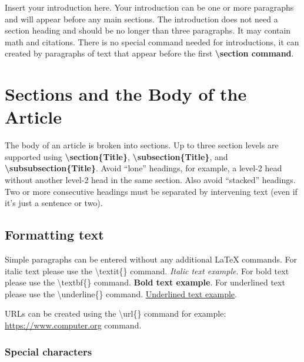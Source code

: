 \documentclass{csmagazine}
\begin{document}
\begin{flushleft}


Insert your introduction here. Your introduction can be one or more paragraphs and will appear before any main sections. The introduction does not need a section heading and should be no longer than three paragraphs. It may contain math and citations. There is no special command needed for introductions, it can created by paragraphs of text that appear before the first \textbf{\textbackslash{}section command}.

\section{Sections and the Body of the Article}

The body of an article is broken into sections. Up to three section levels are supported using \textbf{\textbackslash{}section\{Title\}}, \textbf{\textbackslash{}subsection\{Title\}}, and \textbf{\textbackslash{}subsubsection\{Title\}}. Avoid ``lone'' headings, for example, a level-2 head without another level-2 head in the same section. Also avoid ``stacked'' headings. Two or more consecutive headings must be separated by intervening text (even if it's just a sentence or two).

\subsection{Formatting text}

Simple paragraphs can be entered without any additional LaTeX commands. For italic text please use the \textbackslash{}textit\{\} command. \textit{Italic text example}. For bold text please use the \textbackslash{}textbf\{\} command. \textbf{Bold text example}. For underlined text please use the \textbackslash{}underline\{\} command. \underline{Underlined text example}.

URLs can be created using the \textbackslash{}url\{\} command for example: \url{https://www.computer.org} command.

\subsubsection{Special characters}


\end{flushleft}
\end{document}
